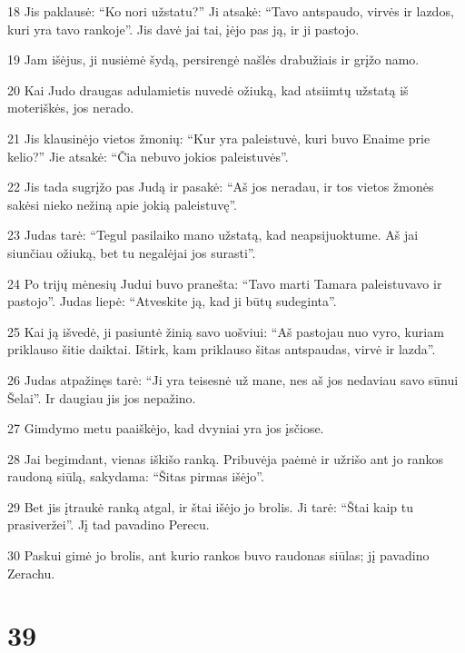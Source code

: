 \par 18 Jis paklausė: “Ko nori užstatu?” Ji atsakė: “Tavo antspaudo, virvės ir lazdos, kuri yra tavo rankoje”. Jis davė jai tai, įėjo pas ją, ir ji pastojo. 
\par 19 Jam išėjus, ji nusiėmė šydą, persirengė našlės drabužiais ir grįžo namo. 
\par 20 Kai Judo draugas adulamietis nuvedė ožiuką, kad atsiimtų užstatą iš moteriškės, jos nerado. 
\par 21 Jis klausinėjo vietos žmonių: “Kur yra paleistuvė, kuri buvo Enaime prie kelio?” Jie atsakė: “Čia nebuvo jokios paleistuvės”. 
\par 22 Jis tada sugrįžo pas Judą ir pasakė: “Aš jos neradau, ir tos vietos žmonės sakėsi nieko nežiną apie jokią paleistuvę”. 
\par 23 Judas tarė: “Tegul pasilaiko mano užstatą, kad neapsijuoktume. Aš jai siunčiau ožiuką, bet tu negalėjai jos surasti”. 
\par 24 Po trijų mėnesių Judui buvo pranešta: “Tavo marti Tamara paleistuvavo ir pastojo”. Judas liepė: “Atveskite ją, kad ji būtų sudeginta”. 
\par 25 Kai ją išvedė, ji pasiuntė žinią savo uošviui: “Aš pastojau nuo vyro, kuriam priklauso šitie daiktai. Ištirk, kam priklauso šitas antspaudas, virvė ir lazda”. 
\par 26 Judas atpažinęs tarė: “Ji yra teisesnė už mane, nes aš jos nedaviau savo sūnui Šelai”. Ir daugiau jis jos nepažino. 
\par 27 Gimdymo metu paaiškėjo, kad dvyniai yra jos įsčiose. 
\par 28 Jai begimdant, vienas iškišo ranką. Pribuvėja paėmė ir užrišo ant jo rankos raudoną siūlą, sakydama: “Šitas pirmas išėjo”. 
\par 29 Bet jis įtraukė ranką atgal, ir štai išėjo jo brolis. Ji tarė: “Štai kaip tu prasiveržei”. Jį tad pavadino Perecu. 
\par 30 Paskui gimė jo brolis, ant kurio rankos buvo raudonas siūlas; jį pavadino Zerachu.



\chapter{39}

